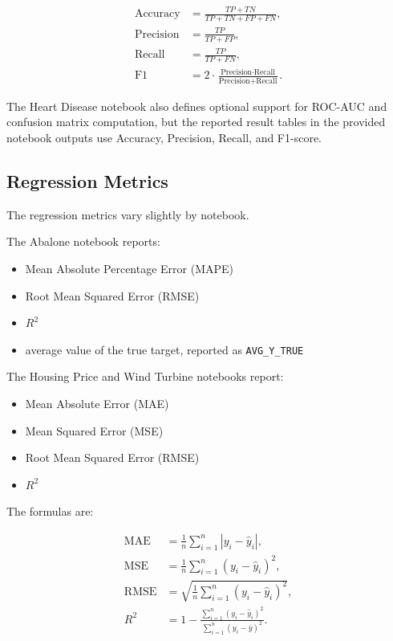 \begin{align*}
\text{Accuracy} &= \frac{TP + TN}{TP + TN + FP + FN}, \\ 
\text{Precision} &= \frac{TP}{TP + FP}, \\ 
\text{Recall} &= \frac{TP}{TP + FN}, \\ 
\text{F1} &= 2 \cdot \frac{\text{Precision} \cdot \text{Recall}}{\text{Precision} + \text{Recall}}.
\end{align*}

The Heart Disease notebook also defines optional support for ROC-AUC and confusion matrix computation, but the reported result tables in the provided notebook outputs use Accuracy, Precision, Recall, and F1-score.

\subsection{Regression Metrics}

The regression metrics vary slightly by notebook.

The Abalone notebook reports:

\begin{itemize}
    \item Mean Absolute Percentage Error (MAPE)
    \item Root Mean Squared Error (RMSE)
    \item $R^2$
    \item average value of the true target, reported as \texttt{AVG\_Y\_TRUE}
\end{itemize}

The Housing Price and Wind Turbine notebooks report:

\begin{itemize}
    \item Mean Absolute Error (MAE)
    \item Mean Squared Error (MSE)
    \item Root Mean Squared Error (RMSE)
    \item $R^2$
\end{itemize}

The formulas are:

\begin{align*}
\text{MAE} &= \frac{1}{n}\sum_{i=1}^{n}|y_i - \hat{y}_i|, \\ 
\text{MSE} &= \frac{1}{n}\sum_{i=1}^{n}(y_i - \hat{y}_i)^2, \\ 
\text{RMSE} &= \sqrt{\frac{1}{n}\sum_{i=1}^{n}(y_i - \hat{y}_i)^2}, \\ 
R^2 &= 1 - \frac{\sum_{i=1}^{n}(y_i - \hat{y}_i)^2}{\sum_{i=1}^{n}(y_i - \bar{y})^2}.
\end{align*}

